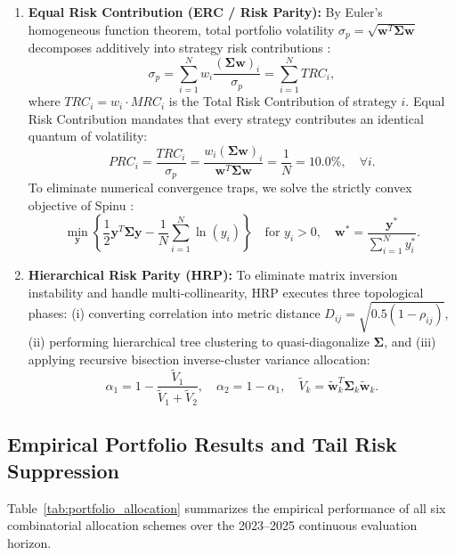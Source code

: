 \documentclass[11pt,a4paper]{article}
\begin{document}
\begin{enumerate}
    \item \textbf{Equal Risk Contribution (ERC / Risk Parity):} By Euler's homogeneous function theorem, total portfolio volatility $\sigma_p = \sqrt{\mathbf{w}^T \boldsymbol{\Sigma} \mathbf{w}}$ decomposes additively into strategy risk contributions \cite{maillard2010properties, qian2005risk}:
    \begin{equation}
    \sigma_p = \sum_{i=1}^N w_i \frac{(\boldsymbol{\Sigma} \mathbf{w})_i}{\sigma_p} = \sum_{i=1}^N TRC_i,
    \end{equation}
    where $TRC_i = w_i \cdot MRC_i$ is the Total Risk Contribution of strategy $i$. Equal Risk Contribution mandates that every strategy contributes an identical quantum of volatility:
    \begin{equation}
    PRC_i = \frac{TRC_i}{\sigma_p} = \frac{w_i (\boldsymbol{\Sigma} \mathbf{w})_i}{\mathbf{w}^T \boldsymbol{\Sigma} \mathbf{w}} = \frac{1}{N} = 10.0\%, \quad \forall i.
    \end{equation}
    To eliminate numerical convergence traps, we solve the strictly convex objective of Spinu \cite{spinu2013algorithm}:
    \begin{equation}
    \min_{\mathbf{y}} \left\{ \frac{1}{2} \mathbf{y}^T \boldsymbol{\Sigma} \mathbf{y} - \frac{1}{N} \sum_{i=1}^N \ln(y_i) \right\} \quad \text{for } y_i > 0, \quad \mathbf{w}^* = \frac{\mathbf{y}^*}{\sum_{i=1}^N y_i^*}.
    \end{equation}
    
    \item \textbf{Hierarchical Risk Parity (HRP):} To eliminate matrix inversion instability and handle multi-collinearity, HRP \cite{lopez2016building} executes three topological phases: (i) converting correlation into metric distance $D_{ij} = \sqrt{0.5(1 - \rho_{ij})}$, (ii) performing hierarchical tree clustering to quasi-diagonalize $\boldsymbol{\Sigma}$, and (iii) applying recursive bisection inverse-cluster variance allocation:
    \begin{equation}
    \alpha_1 = 1 - \frac{\widetilde{V}_1}{\widetilde{V}_1 + \widetilde{V}_2}, \quad \alpha_2 = 1 - \alpha_1, \quad \widetilde{V}_k = \widetilde{\mathbf{w}}_k^T \boldsymbol{\Sigma}_k \widetilde{\mathbf{w}}_k.
    \end{equation}
\end{enumerate}

\subsection{Empirical Portfolio Results and Tail Risk Suppression}
Table~\ref{tab:portfolio_allocation} summarizes the empirical performance of all six combinatorial allocation schemes over the 2023--2025 continuous evaluation horizon.
\end{document}
